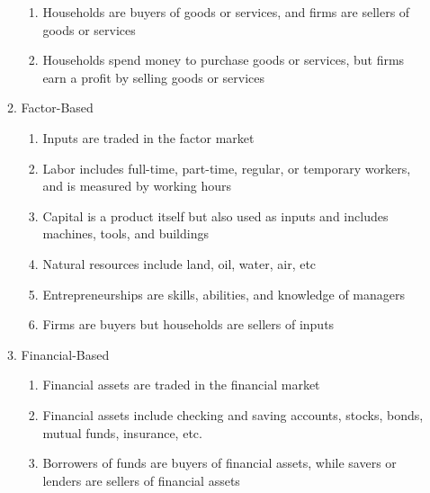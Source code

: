 \documentclass[12pt]{article}
\begin{document}
\begin{enumerate}
\begin{enumerate}
\begin{enumerate}
              \item Households are buyers of goods or services, and firms are sellers of goods or services

              \item Households spend money to purchase goods or services, but firms earn a profit by selling goods or services

            \end{enumerate}

          \item Factor-Based

            \begin{enumerate}

              \item Inputs are traded in the factor market

              \item Labor includes full-time, part-time, regular, or temporary workers, and is measured by working hours

              \item Capital is a product itself but also used as inputs and includes machines, tools, and buildings

              \item Natural resources include land, oil, water, air, etc

              \item Entrepreneurships are skills, abilities, and knowledge of managers

              \item Firms are buyers but households are sellers of inputs

            \end{enumerate}

          \item Financial-Based

            \begin{enumerate}

              \item Financial assets are traded in the financial market

              \item Financial assets include checking and saving accounts, stocks, bonds, mutual funds, insurance, etc.

              \item Borrowers of funds are buyers of financial assets, while savers or lenders are sellers of financial assets


\end{enumerate}
\end{enumerate}
\end{enumerate}
\end{document}
